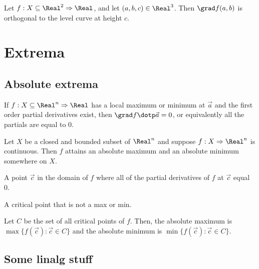 \begin{theorem}
  Let $f : X \subseteq \Real^2 \Rightarrow \Real$, and let $(a, b, c) \in \Real^3$. Then $\grad f(a, b)$ is orthogonal to the level curve at height $c$.
\end{theorem}

\section{Extrema}

\subsection{Absolute extrema}


\begin{theorem}
  If $f : X \subseteq \Real^n \Rightarrow \Real$ has a local maximum or minimum at $\vec{a}$ and the first order partial derivatives exist, then $\grad f \dotp \vec{a} = 0$, or equivalently all the partials are equal to 0.
\end{theorem}

\begin{namedtheorem}
  Let $X$ be a closed and bounded subset of $\Real^n$ and suppose $f : X \Rightarrow \Real^n$ is continuous. Then $f$ attains an absolute maximum and an absolute minimum somewhere on $X$.
\end{namedtheorem}

\begin{definition}
  A point $\vec{c}$ in the domain of $f$ where all of the partial derivatives of $f$ at $\vec{c}$ equal 0.
\end{definition}

\begin{definition}
  A critical point that is not a max or min.
\end{definition}

\begin{theorem}
  Let $C$ be the set of all critical points of $f$. Then, the absolute maximum is $\max \{f(\vec{c}) : \vec{c} \in C\}$ and the absolute minimum is $\min \{f(\vec{c}) : \vec{c} \in C\}$.
\end{theorem}

\subsection{Some linalg stuff}

